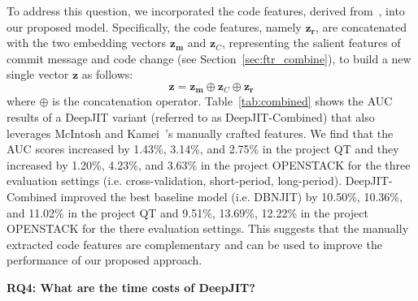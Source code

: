 To address this question, we incorporated the code features, derived from~\cite{mcintosh2018fix}, into our proposed model. Specifically, the code features, namely $\textbf{z}_\textbf{r}$, are concatenated with the two embedding vectors  $\textbf{z}_\textbf{m}$ and $\textbf{z}_C$, representing the salient features of commit message and code change (see Section~\ref{sec:ftr_combine}), to build a new single vector $\textbf{z}$ as follows:
\begin{equation}
\label{eq:combined_ftr}
\textbf{z} = \textbf{z}_\textbf{m} \oplus \textbf{z}_C \oplus \textbf{z}_\textbf{r}
\end{equation}
where $\oplus$ is the concatenation operator. Table~\ref{tab:combined} shows the AUC results of a DeepJIT variant (referred to as DeepJIT-Combined) that also leverages McIntosh and Kamei~\cite{mcintosh2018fix}'s manually crafted features. We find that the AUC scores increased by 1.43\%, 3.14\%, and 2.75\% in the project QT and they increased by 1.20\%, 4.23\%, and 3.63\% in the project OPENSTACK for the three evaluation settings (i.e. cross-validation, short-period, long-period). DeepJIT-Combined improved the best baseline model (i.e. DBNJIT) by 10.50\%, 10.36\%, and 11.02\% in the project QT and 9.51\%, 13.69\%, 12.22\% in the project OPENSTACK for the there evaluation settings. This suggests that the manually extracted code features are complementary and can be used to improve the performance of our proposed approach.

\hspace{0.5cm}

\noindent \textbf{RQ4: What are the time costs of DeepJIT?}

